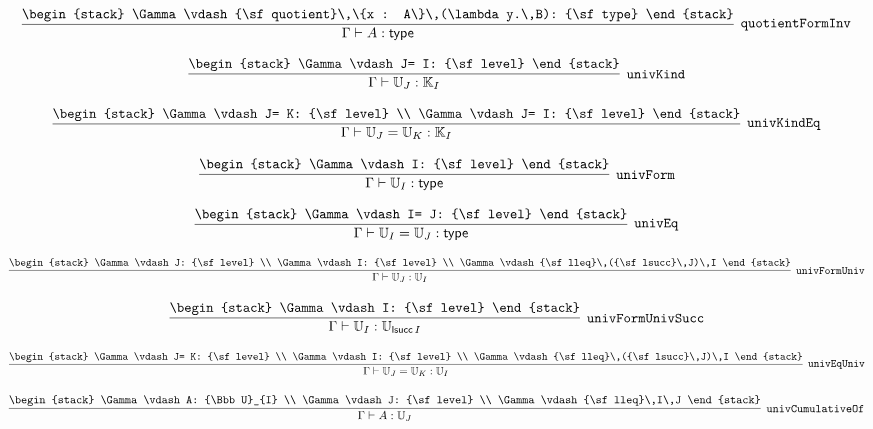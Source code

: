 \[
\infer[{\tt quotientFormInv}]{\Gamma \vdash A: {\sf type}}{
\begin{stack}
\Gamma \vdash {\sf quotient}\,\{x : A\}\,(\lambda y.\,B): {\sf type}
\end{stack}}
\]

\[
\infer[{\tt univKind}]{\Gamma \vdash {\Bbb U}_{J}: {\Bbb K}_{I}}{
\begin{stack}
\Gamma \vdash J= I: {\sf level}
\end{stack}}
\]

\[
\infer[{\tt univKindEq}]{\Gamma \vdash {\Bbb U}_{J}= {\Bbb U}_{K}: {\Bbb K}_{I}}{
\begin{stack}
\Gamma \vdash J= K: {\sf level}
\\
\Gamma \vdash J= I: {\sf level}
\end{stack}}
\]

\[
\infer[{\tt univForm}]{\Gamma \vdash {\Bbb U}_{I}: {\sf type}}{
\begin{stack}
\Gamma \vdash I: {\sf level}
\end{stack}}
\]

\[
\infer[{\tt univEq}]{\Gamma \vdash {\Bbb U}_{I}= {\Bbb U}_{J}: {\sf type}}{
\begin{stack}
\Gamma \vdash I= J: {\sf level}
\end{stack}}
\]

\[
\infer[{\tt univFormUniv}]{\Gamma \vdash {\Bbb U}_{J}: {\Bbb U}_{I}}{
\begin{stack}
\Gamma \vdash J: {\sf level}
\\
\Gamma \vdash I: {\sf level}
\\
\Gamma \vdash {\sf lleq}\,({\sf lsucc}\,J)\,I
\end{stack}}
\]

\[
\infer[{\tt univFormUnivSucc}]{\Gamma \vdash {\Bbb U}_{I}: {\Bbb U}_{{\sf lsucc}\,I}}{
\begin{stack}
\Gamma \vdash I: {\sf level}
\end{stack}}
\]

\[
\infer[{\tt univEqUniv}]{\Gamma \vdash {\Bbb U}_{J}= {\Bbb U}_{K}: {\Bbb U}_{I}}{
\begin{stack}
\Gamma \vdash J= K: {\sf level}
\\
\Gamma \vdash I: {\sf level}
\\
\Gamma \vdash {\sf lleq}\,({\sf lsucc}\,J)\,I
\end{stack}}
\]

\[
\infer[{\tt univCumulativeOf}]{\Gamma \vdash A: {\Bbb U}_{J}}{
\begin{stack}
\Gamma \vdash A: {\Bbb U}_{I}
\\
\Gamma \vdash J: {\sf level}
\\
\Gamma \vdash {\sf lleq}\,I\,J
\end{stack}}
\]

